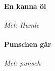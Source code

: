\documentclass[12pt]{article}
\begin{document}
\newpage
\noindent
\begin{minipage}{0.55\textwidth}
	\paragraph*{En kanna öl\\}
	\vspace{3px}
	\textit{Mel: Humle}\\
\end{minipage}
\hspace{0.05\textwidth}
\noindent
\begin{minipage}{0.4\textwidth}
	\paragraph*{Punschen går\\}
	\vspace{3px}
	\textit{Mel: punsch}\\
\end{minipage}
\end{document}
